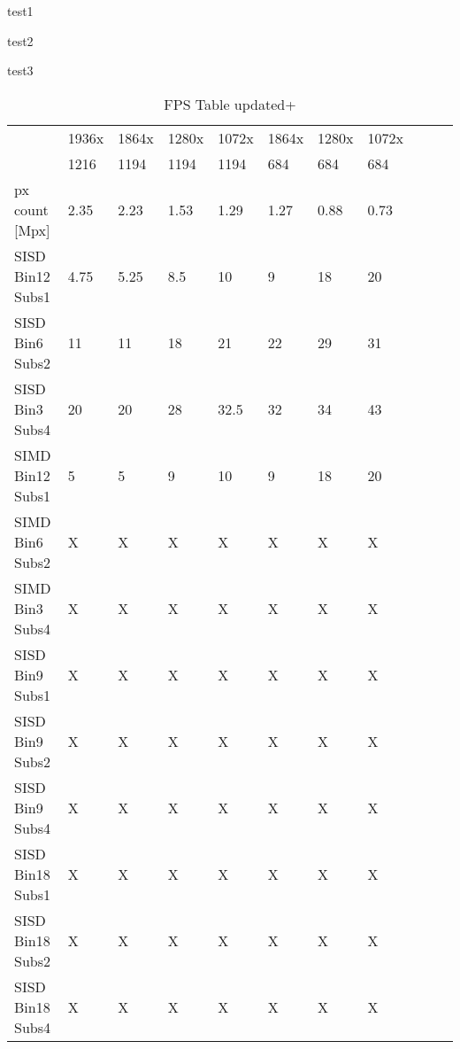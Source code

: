 \documentclass[11pt]{article}
\begin{document}
\sffamily

test1

\sfdefault

test2

{\sffamily
test3}


\begin{table}[ht]
    \centering
    
    \caption*{FPS Table updated+}
    \begin{tabular}{|l|l|l|l|l|l|l|l|l|l|l|}
        \hline
         & \textsf{1936x} & \textsf{1864x} & \textsf{1280x} & \textsf{1072x} & \textsf{1864x} & \textsf{1280x} & \textsf{1072x} \\
         & \textsf{1216}  & \textsf{1194}  & \textsf{1194}  & \textsf{1194}  & \textsf{684}   & \textsf{684}   & \textsf{684}   \\
        \hline
        px count [Mpx]   & 2.35  & 2.23  & 1.53  & 1.29  & 1.27  & 0.88  & 0.73 \\
        \hline
        \hline
        \hline
        SISD Bin12 Subs1 & 4.75  & 5.25  & 8.5   & 10    & 9     & 18    & 20    \\ \hline
        SISD Bin6 Subs2  & 11    & 11    & 18    & 21    & 22    & 29    & 31    \\ \hline
        SISD Bin3 Subs4  & 20    & 20    & 28    & 32.5  & 32    & 34    & 43    \\
        \hline                                                                             
        \hline                                                                             
        SIMD Bin12 Subs1 & 5     & 5     & 9     & 10    & 9     & 18    & 20    \\ \hline
        SIMD Bin6 Subs2  & X     & X     & X     & X     & X     & X     & X     \\ \hline
        SIMD Bin3 Subs4  & X     & X     & X     & X     & X     & X     & X     \\
        \hline                                                                             
        \hline                                                                             
        SISD Bin9 Subs1  & X     & X     & X     & X     & X     & X     & X     \\ \hline
        SISD Bin9 Subs2  & X     & X     & X     & X     & X     & X     & X     \\ \hline
        SISD Bin9 Subs4  & X     & X     & X     & X     & X     & X     & X     \\ \hline
        SISD Bin18 Subs1 & X     & X     & X     & X     & X     & X     & X     \\ \hline
        SISD Bin18 Subs2 & X     & X     & X     & X     & X     & X     & X     \\ \hline
        SISD Bin18 Subs4 & X     & X     & X     & X     & X     & X     & X     \\ \hline
    \end{tabular}
\end{table}
\end{document}
